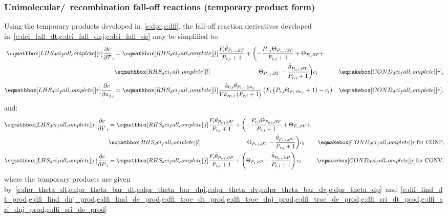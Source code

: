 \documentclass[12pt]{article}
\newcommand{\conp}{CONP}
\newcommand{\conv}{CONV}
\newcommand{\dconp}{\ifmmode\text{for \conp,}\else for \conp,\fi}
\newcommand{\dconv}{\ifmmode\text{for \conv,}\else for \conv,\fi}
\begin{document}
\subsubsection{Unimolecular\slash~recombination fall-off reactions (temporary product form)}
Using the temporary products developed in~\cref{s:dpr,s:dfi}, the fall-off reaction derivatives developed in~\cref{e:dci_fall_dt,e:dci_fall_dnj,e:dci_fall_de} may be simplified to:
\begin{align}
\lhs{dci_fall_complete}{\frac{\partial c }{\partial T }_{i}} &= \rhs{dci_fall_complete}{\frac{F_{i} \bar{\theta}_{P_{r, i}, \partial T}}{P_{r, i} + 1} + \biggl(- \frac{P_{r, i} \Theta_{P_{r,i}, \partial T}}{P_{r, i} + 1} + \Theta_{F_i, \partial T} + } & \nonumber \\
							     &  \rhs{dci_fall_complete}{\mathindent[largerindentpleas] \Theta_{P_{r,i}, \partial T} - \frac{\bar{\theta}_{P_{r, i}, \partial T}}{P_{r, i} + 1}\biggr) c_{i}} & \cond{dci_fall_complete}{,} \\
\lhs{dci_fall_complete}{\frac{\partial c }{\partial {n_j} }_{i}} &= \rhs{dci_fall_complete}{\frac{k_{0, i} \bar{\theta}_{P_{r, i}, \partial n_j}}{V k_{\infty, i} \left(P_{r, i} + 1\right)} \left(F_{i} \left(P_{r, i} \Theta_{F_i, \partial n_j} + 1\right) - c_{i}\right)} & \cond{dci_fall_complete}{,}
\end{align}
and:
\begin{subequations}
 \begin{align}
  \lhs{dci_fall_complete}{\frac{\partial c }{\partial V }_{i}} &= \rhs{dci_fall_complete}{\frac{F_{i} \bar{\theta}_{P_{r, i}, \partial V}}{P_{r, i} + 1} + \biggl(- \frac{P_{r, i} \Theta_{P_{r,i}, \partial V}}{P_{r, i} + 1} + \Theta_{F_i, \partial V} + } & \nonumber \\
							       &  \rhs{dci_fall_complete}{\mathindent[largerindentpleas] \Theta_{P_{r,i}, \partial V} - \frac{\bar{\theta}_{P_{r, i}, \partial V}}{P_{r, i} + 1} \biggr) c_{i}} & \cond{dci_fall_complete}{\dconp} \\
  \lhs{dci_fall_complete}{\frac{\partial c }{\partial P }_{i}} &= \rhs{dci_fall_complete}{\frac{F_{i} \bar{\theta}_{P_{r, i}, \partial P}}{P_{r, i} + 1} + \left(\Theta_{F_i, \partial P} - \frac{\bar{\theta}_{P_{r, i}, \partial P}}{P_{r, i} + 1}\right) c_{i}} & \cond{dci_fall_complete}{\dconv}
 \end{align}
\end{subequations}
where the temporary products are given by~\cref{e:dpr_theta_dt,e:dpr_theta_bar_dt,e:dpr_theta_bar_dnj,e:dpr_theta_dv,e:dpr_theta_bar_dv,e:dpr_theta_dp}~and~\cref{e:dfi_lind_dt_prod,e:dfi_lind_dnj_prod,e:dfi_lind_de_prod,e:dfi_troe_dt_prod,e:dfi_troe_dnj_prod,e:dfi_troe_de_prod,e:dfi_sri_dt_prod,e:dfi_sri_dnj_prod,e:dfi_sri_de_prod}
\end{document}
